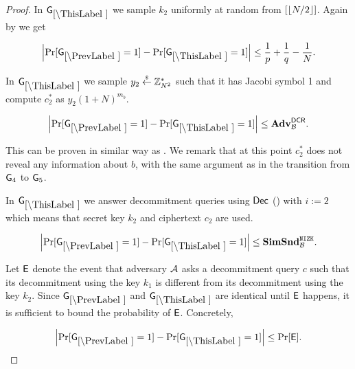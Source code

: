 \begin{proof}
In $\games_\thisgame$ we sample $k_2$ uniformly at random from $[\left\lfloor N/2 \right\rfloor]$. Again by  we get


\begin{lemma}
\[
\left|\Pr[\games_\prevgame = 1] - \Pr[\games_\thisgame = 1]\right| \leq \frac{1}{p}+\frac{1}{q}-\frac{1}{N}.
\]
\end{lemma}


In $\games_\thisgame$ we sample $y_2 \stackrel{{\scriptscriptstyle\$}}{\leftarrow} \mathbb{Z}_{N^2}^*$ such that it has Jacobi symbol 1 and compute $c_2^*$ as $y_2(1+N)^{m_b}$. 

\begin{lemma}
\[
\left|\Pr[\games_\prevgame = 1] - \Pr[\games_\thisgame = 1]\right| \leq \advtg_\advB^\dcr.
\]
\end{lemma}
This can be proven in similar way as . We remark that at this point $c_2^*$ does not reveal any information about $b$, with the same argument as in the transition from $\mathsf{G}_4$ to $\mathsf{G}_5$.




In $\games_\thisgame$ we answer decommitment queries using $\mathsf{Dec}$ () with $i:=2$ which means that secret key $k_2$ and ciphertext $c_2$ are used. 

\begin{lemma}
\[
\left|\Pr[\games_\prevgame = 1] - \Pr[\games_\thisgame = 1]\right| \leq \simsnd^\nizk_\advB. 
\]
\end{lemma}

Let $\mathsf{E}$ denote the event that adversary $\mathcal{A}$ asks a decommitment query $c$ such that its decommitment using the key $k_1$ is different from its decommitment using the key $k_2$. Since $\games_\prevgame$ and $\games_\thisgame$ are identical until $\mathsf{E}$ happens, it is sufficient to bound the probability of $\mathsf{E}$. Concretely,  

\[
\left|\Pr[\games_\prevgame = 1] - \Pr[\games_\thisgame = 1]\right| \leq \Pr[\event]. 
\]


\end{proof}
